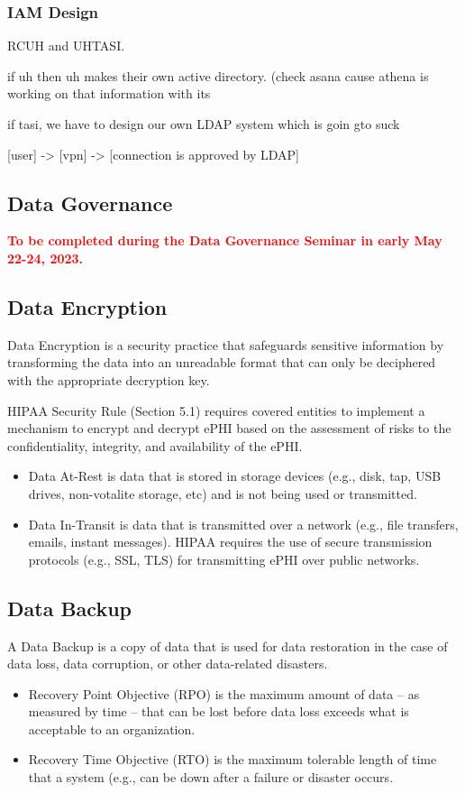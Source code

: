 \subsubsection{IAM Design}

RCUH and UHTASI.

if uh then uh makes their own active directory. (check asana cause athena is working on that information with its

if tasi, we have to design our own LDAP system which is goin gto suck 

[user] -> [vpn] -> [connection is approved by LDAP]

\subsection{Data Governance}
\textcolor{red}{\textbf{To be completed during the Data Governance Seminar in early May 22-24, 2023.}}

\subsection{Data Encryption}

Data Encryption is a security practice that safeguards sensitive information by transforming the data into an unreadable format that can only be deciphered with the appropriate decryption key. 

HIPAA Security Rule (Section 5.1) requires covered entities to implement a mechanism to encrypt and decrypt ePHI based on the assessment of risks to the confidentiality, integrity, and availability of the ePHI. 

\begin{itemize}
    \item Data At-Rest is data that is stored in storage devices (e.g., disk, tap, USB drives, non-votalite storage, etc) and is not being used or transmitted.
    \item Data In-Transit is data that is transmitted over a network (e.g., file transfers, emails, instant messages). HIPAA requires the use of secure transmission protocols (e.g., SSL, TLS) for transmitting ePHI over public networks. 
\end{itemize}

\subsection{Data Backup}

A Data Backup is a copy of data that is used for data restoration in the case of data loss, data corruption, or other data-related disasters.

\begin{itemize}
    \item Recovery Point Objective (RPO) is the maximum amount of data – as measured by time – that can be lost before data loss exceeds what is acceptable to an organization.
    \item Recovery Time Objective (RTO) is the maximum tolerable length of time that a system (e.g., can be down after a failure or disaster occurs. 
\end{itemize}